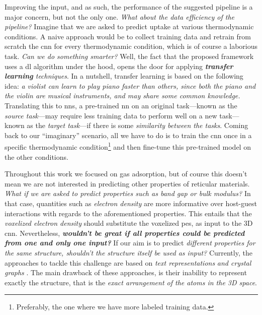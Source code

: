 Improving the input, and as such, the performance of the suggested pipeline is a
major concern, but not the only one. \emph{What about the data
efficiency of the pipeline?} Imagine that we are asked to
predict  uptake at various thermodynamic conditions. A naive approach would be to collect training data and retrain from scratch the \gls{cnn} for every thermodynamic condition,
which is of course a laborious task. \emph{Can we do something smarter?} Well,
the fact that the proposed framework uses a \gls{dl} algorithm under the hood, opens the door for applying
\emph{\textbf{transfer learning} techniques}.  In a
nutshell, transfer learning \parencite{Zhuang2019, Ma2020, Kang2023} is based on
the following idea: \emph{a violist can learn to play piano faster than others,
since both the piano and the violin are musical instruments, and may share some
common knowledge.} Translating this to \glspl{nn}, a pre-trained \gls{nn} on an
original task---known as the \emph{source task}---may require
less training data to perform well on a new task---known as the \emph{target
task}---if there is some \emph{similarity between the tasks}.
Coming back to our ``imaginary'' scenario, all we have to do is to train the
\gls{cnn} once in a specific thermodynamic condition\footnote{Preferably, the
one where we have more labeled training data.} and then
fine-tune this pre-trained model on
the other conditions.

Throughout this work we focused on gas adsorption, but of course this doesn't
mean we are not interested in predicting other properties of reticular
materials. \emph{What if we are asked to predict
properties such as band gap or bulk modulus?} In that case, quantities such as \emph{electron
density} are more informative over host-guest
interactions with regards to the aforementioned
properties. This entails that the \emph{voxelized electron
density} should substitute the voxelized
\gls{pes}, as input to the 3D \gls{cnn}. Nevertheless, \emph{\textbf{wouldn't be
great if all properties could be predicted from one and only one input?}} If our
aim is to predict \emph{different properties for the same structure, shouldn't
the structure itself be used as input?} Currently, the approaches to tackle this
challenge are based on \emph{text representations}
\parencite{Cao2023, Bucior2019} \emph{and crystal graphs}
\parencite{Chen2019, Xie2018}. The main drawback of these approaches, is their
inability to represent exactly the structure, that is the \emph{exact
arrangement of the atoms in the 3D space}.

